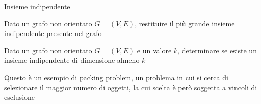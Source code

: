 \begin{frame}{Insieme indipendente}

\vspace{-9pt}
\begin{myboxtitle}
Dato un grafo non orientato $G=(V,E)$, restituire il più grande insieme indipendente presente nel grafo
\end{myboxtitle}

\begin{myboxtitle}
Dato un grafo non orientato $G=(V,E)$ e un valore $k$, determinare se esiste un insieme indipendente di dimensione almeno $k$
\end{myboxtitle}

\begin{myboxtitle}
Questo è un esempio di \alert{packing problem}, un problema in cui si cerca
di selezionare il maggior numero di oggetti, la cui scelta è però soggetta
a vincoli di esclusione
\end{myboxtitle}

\end{frame}


